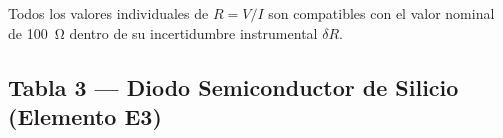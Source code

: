 \begin{table}[H]
    \centering
    \caption{Mediciones directas $V$--$I$ de la resistencia de composición de carbón de \qty{100}{\ohm}. Se incluyen $R = V/I$ y su incertidumbre propagada $\delta R$ (Ec.~\eqref{eq:prop_errores_R}).}
    \label{tab:datos_resistencia}
\end{table}

Todos los valores individuales de $R = V/I$ son compatibles con el valor nominal de \qty{100}{\ohm} dentro de su incertidumbre instrumental $\delta R$.

\subsection{Tabla 3 --- Diodo Semiconductor de Silicio (Elemento E3)}

